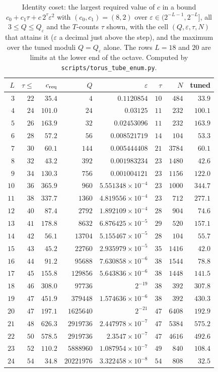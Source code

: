 \documentclass[aps,prx,twocolumn,superscriptaddress,nofootinbib,longbibliography]{revtex4-2}
\theoremstyle{plain}
\theoremstyle{definition}
\theoremstyle{remark}
\begin{document}
\begin{table}[t]\centering\footnotesize
\caption{Identity coset: the largest required value of $c$ in a bound $c_0+c_1\tau+c\,2^\tau\varepsilon^2$ with $(c_0,c_1)=(8,2)$ over $\varepsilon\in(2^{-L-1},2^{-L}]$, all $3\le Q\le Q_\varepsilon$ and the $T$-counts $\tau$ shown, with the cell $(Q,\varepsilon,\tau,N)$ that attains it ($\varepsilon$ a decimal just above the step), and the maximum over the tuned moduli $Q=Q_\varepsilon$ alone. The rows $L=18$ and $20$ are limits at the lower end of the octave. Computed by \texttt{scripts/torus\_tube\_enum.py}.}
\label{tab:tubeenum}
\setlength{\tabcolsep}{3pt}\begin{tabular}{@{}r r r r r r r r@{}}
\toprule
$L$ & $\tau\le$ & $c_{\rm req}$ & $Q$ & $\varepsilon$ & $\tau$ & $N$ & tuned\\
\midrule
$3$&$22$&$35.4$&$4$&$0.1120854$&$10$&$484$&$33.9$\\
$4$&$24$&$101.0$&$24$&$0.03125$&$11$&$232$&$100.1$\\
$5$&$26$&$163.9$&$32$&$0.02453096$&$11$&$232$&$163.9$\\
$6$&$28$&$57.2$&$56$&$0.008521719$&$14$&$104$&$53.3$\\
$7$&$30$&$60.1$&$144$&$0.005444408$&$21$&$3784$&$60.1$\\
$8$&$32$&$43.2$&$392$&$0.001983234$&$23$&$1480$&$42.6$\\
$9$&$34$&$130.3$&$756$&$0.001004121$&$23$&$1156$&$122.0$\\
$10$&$36$&$365.9$&$960$&$5.551348\times10^{-4}$&$23$&$1000$&$344.7$\\
$11$&$38$&$337.7$&$1360$&$4.819556\times10^{-4}$&$23$&$712$&$277.1$\\
$12$&$40$&$87.4$&$2792$&$1.892109\times10^{-4}$&$28$&$904$&$74.6$\\
$13$&$41$&$178.8$&$8632$&$6.876425\times10^{-5}$&$29$&$520$&$157.1$\\
$14$&$42$&$56.1$&$13704$&$5.155467\times10^{-5}$&$28$&$104$&$55.7$\\
$15$&$43$&$45.2$&$22760$&$2.935979\times10^{-5}$&$35$&$1416$&$42.0$\\
$16$&$44$&$91.2$&$95688$&$7.630858\times10^{-6}$&$38$&$1544$&$78.8$\\
$17$&$45$&$155.8$&$129856$&$5.643836\times10^{-6}$&$38$&$1448$&$141.5$\\
$18$&$46$&$308.0$&$97736$&$2^{-19}$&$38$&$392$&$307.8$\\
$19$&$47$&$451.9$&$379448$&$1.574636\times10^{-6}$&$38$&$392$&$430.3$\\
$20$&$47$&$197.1$&$1625640$&$2^{-21}$&$47$&$6408$&$192.9$\\
$21$&$48$&$626.3$&$2919736$&$2.447978\times10^{-7}$&$47$&$5384$&$575.2$\\
$22$&$50$&$578.5$&$2919736$&$2.3547\times10^{-7}$&$47$&$4616$&$492.6$\\
$23$&$52$&$110.2$&$5888960$&$1.087954\times10^{-7}$&$49$&$840$&$108.4$\\
$24$&$54$&$34.8$&$20221976$&$3.322458\times10^{-8}$&$54$&$808$&$32.5$\\
\bottomrule
\end{tabular}\end{table}
\end{document}
